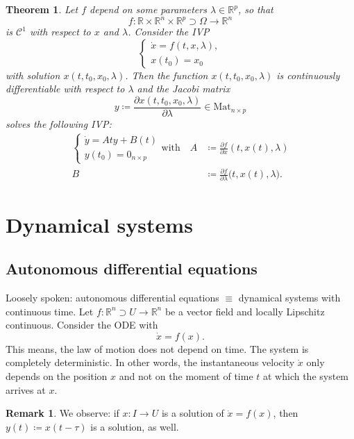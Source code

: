 \documentclass[hidelinks,a4paper, 11pt]{article}
\theoremstyle{plain}
\newtheorem{theorem}{Theorem}
\theoremstyle{break}
\theoremstyle{plain}
\theoremstyle{definition}
\newtheorem*{remark}{Remark}
\begin{document}
\begin{theorem}
	Let $f$ depend on some parameters $\lambda \in \mathbb R^p$, so that 
	\[
		f: \mathbb R \times \mathbb R^n \times \mathbb R^p \supset \Omega \to \mathbb R^n
	\]
	is $\mathcal C^1$ with respect to $x$ and $\lambda$. Consider the IVP
	\[
		\begin{cases}
			\dot x = f(t,x, \lambda), \\
			x(t_0) = x_0
		\end{cases}
	\]
	with solution $x(t, t_0,x_0, \lambda)$. Then the function $x(t,t_0,x_0,\lambda)$ is continuously differentiable with respect to $\lambda$ and the Jacobi matrix 
	\[
		y \coloneqq \frac{\partial x (t,t_0,x_0,\lambda)}{\partial \lambda} \in \mathrm{Mat}_{n \times p}
	\]
	solves the following IVP:
	\begin{align*}
		\begin{cases}
			\dot y = Aty + B(t) \\
			y(t_0) = 0_{n \times p}
		\end{cases}\text{with} \quad 
		A &\coloneqq \frac{\partial f}{\partial x} (t,x(t), \lambda) \\
		B &\coloneqq \frac{\partial f}{\partial \lambda}\big(t,x(t), \lambda \big).
	\end{align*}
\end{theorem}

\section{Dynamical systems}

\subsection{Autonomous differential equations}
Loosely spoken: autonomous differential equations $\equiv$ dynamical systems with continuous time. Let $f: \mathbb R^n \supset U \to \mathbb R^n$ be a vector field and locally Lipschitz continuous. Consider the ODE with
\[
	\dot x = f(x).
\]
This means, the law of motion does not depend on time. The system is completely deterministic. In other words, the instantaneous velocity $\dot x$ only depends on the position $x$ and not on the moment of time $t$ at which the system arrives at $x$.

\begin{remark}
	We observe: if $x: I \to U$ is a solution of $\dot x = f(x)$, then $y(t) \coloneqq x(t- \tau)$ is a solution, as well.
\end{remark}
\end{document}
